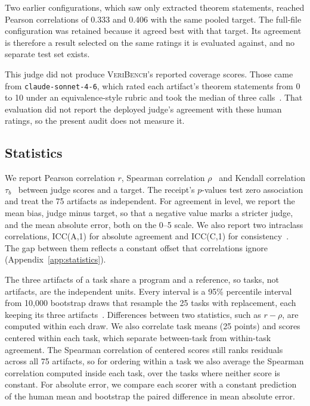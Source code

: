 Two earlier configurations, which saw only extracted theorem statements, reached Pearson correlations of 0.333 and 0.406 with the same pooled target.
The full-file configuration was retained because it agreed best with that target.
Its agreement is therefore a result selected on the same ratings it is evaluated against, and no separate test set exists.

This judge did not produce \textsc{VeriBench}'s reported coverage scores.
Those came from \texttt{claude-sonnet-4-6}, which rated each artifact's theorem statements from 0 to 10 under an equivalence-style rubric and took the median of three calls~\citep{veribench2026}.
That evaluation did not report the deployed judge's agreement with these human ratings, so the present audit does not measure it.

\subsection{Statistics}
\label{sec:statistics}
We report Pearson correlation $r$, Spearman correlation $\rho$~\citep{spearman1904proof} and Kendall correlation $\tau_b$~\citep{kendall1938new} between judge scores and a target.
The receipt's $p$-values test zero association and treat the 75 artifacts as independent.
For agreement in level, we report the mean bias, judge minus target, so that a negative value marks a stricter judge, and the mean absolute error, both on the 0--5 scale.
We also report two intraclass correlations, ICC(A,1) for absolute agreement and ICC(C,1) for consistency~\citep{shrout1979intraclass,mcgraw1996forming}.
The gap between them reflects a constant offset that correlations ignore (Appendix~\ref{app:statistics}).

The three artifacts of a task share a program and a reference, so tasks, not artifacts, are the independent units.
Every interval is a 95\% percentile interval from 10,000 bootstrap draws that resample the 25 tasks with replacement, each keeping its three artifacts~\citep{efron1993introduction,field2007bootstrapping}.
Differences between two statistics, such as $r-\rho$, are computed within each draw.
We also correlate task means (25 points) and scores centered within each task, which separate between-task from within-task agreement.
The Spearman correlation of centered scores still ranks residuals across all 75 artifacts, so for ordering within a task we also average the Spearman correlation computed inside each task, over the tasks where neither score is constant.
For absolute error, we compare each scorer with a constant prediction of the human mean and bootstrap the paired difference in mean absolute error.

